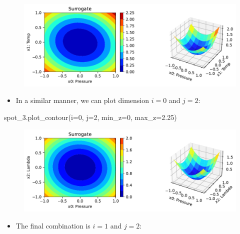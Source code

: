 \documentclass[
  letterpaper,
  DIV=11,
  numbers=noendperiod]{scrreprt}
\newenvironment{Shaded}{\begin{snugshade}}{\end{snugshade}}
\newcommand{\DecValTok}[1]{\textcolor[rgb]{0.68,0.00,0.00}{#1}}
\newcommand{\FloatTok}[1]{\textcolor[rgb]{0.68,0.00,0.00}{#1}}
\newcommand{\NormalTok}[1]{\textcolor[rgb]{0.00,0.23,0.31}{#1}}
\newcommand{\OperatorTok}[1]{\textcolor[rgb]{0.37,0.37,0.37}{#1}}
\providecommand{\tightlist}{%
  \setlength{\itemsep}{0pt}\setlength{\parskip}{0pt}}\usepackage{longtable,booktabs,array}
\begin{document}
\begin{figure}[H]

{\centering \includegraphics{008_num_spot_multidim_files/figure-pdf/cell-8-output-1.pdf}

}

\end{figure}

\begin{itemize}
\tightlist
\item
  In a similar manner, we can plot dimension \(i=0\) and \(j=2\):
\end{itemize}

\begin{Shaded}
\begin{Highlighting}[]
\NormalTok{spot\_3.plot\_contour(i}\OperatorTok{=}\DecValTok{0}\NormalTok{, j}\OperatorTok{=}\DecValTok{2}\NormalTok{, min\_z}\OperatorTok{=}\DecValTok{0}\NormalTok{, max\_z}\OperatorTok{=}\FloatTok{2.25}\NormalTok{)}
\end{Highlighting}
\end{Shaded}

\begin{figure}[H]

{\centering \includegraphics{008_num_spot_multidim_files/figure-pdf/cell-9-output-1.pdf}

}

\end{figure}

\begin{itemize}
\tightlist
\item
  The final combination is \(i=1\) and \(j=2\):
\end{itemize}
\end{document}
